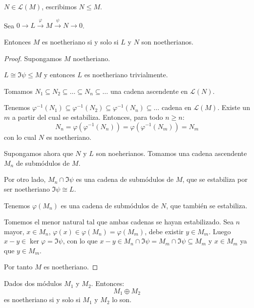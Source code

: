\begin{nt}
  \(N\in\mathcal{L}(M)\), escribimos \(N\le M\).
\end{nt}

\begin{prop}
  Sea \(0\longrightarrow L\overset{\varphi}{\longrightarrow}
  M\overset{\psi}{\longrightarrow} N
  \longrightarrow 0\).

  Entonces \(M\) es noetheriano si y solo si \(L\) y \(N\) son
  noetherianos.
\end{prop}

\begin{proof}
  Supongamos \(M\) noetheriano.

  \(L\cong \Im\psi\le M\) y entonces \(L\) es noetheriano trivialmente.

  Tomamos \(N_1\subseteq N_2\subseteq\ldots\subseteq N_n\subseteq\ldots\)
  una cadena ascendente en \(\mathcal{L}(N)\).

  Tenemos \(\varphi^{-1}(N_1)\subseteq \varphi^{-1}(N_2)
  \subseteq \varphi^{-1}(N_n)\subseteq\ldots\)
  cadena en \(\mathcal{L}(M)\). Existe un \(m\) a partir del cual
  se estabiliza. Entonces, para todo \(n\ge n\):
  \[
    N_n=\varphi(\varphi^{-1}(N_n))=\varphi(\varphi^{-1}(N_m))=N_m
  \]
  con lo cual \(N\) es noetheriano.


  Supongamos ahora que \(N\) y \(L\) son noeherianos.
  Tomamos una cadena ascendente \(M_n\) de submódulos de \(M\).

  Por otro lado, \(M_n\cap\Im\psi\) es una cadena de submódulos de
  \(M\), que se estabiliza por ser noetheriano \(\Im\psi\cong L\).

  Tenemos \(\varphi(M_n)\) es una cadena de submódulos de \(N\),
  que también se estabiliza.

  Tomemos el menor natural tal que ambas cadenas se hayan estabilizado.
  Sea \(n\) mayor, \(x\in M_n\), \(\varphi(x)\in\varphi(M_n)
  =\varphi(M_m)\), debe existir \(y\in M_m\). Luego \(x-y\in\ker\varphi
  =\Im\psi\), con lo que \(x-y\in M_n\cap\Im\psi=M_m\cap\Im\psi\subseteq M_m\)
  y \(x\in M_m\) ya que \(y\in M_m\).

  Por tanto \(M\) es noetheriano.
\end{proof}

\begin{cor}
  Dados dos módulos \(M_1\) y \(M_2\).
  Entonces:
  \[
    M_1\oplus M_2
  \]
  es noetheriano si y solo si \(M_1\) y \(M_2\) lo son.
\end{cor}

